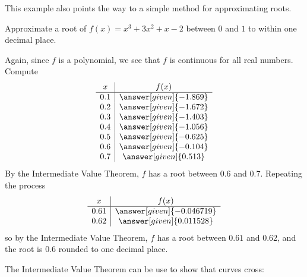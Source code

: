 \documentclass{ximera}
\begin{document}
This example also points the way to a simple method for approximating
roots. 



\begin{example} 
Approximate a root of $f(x) =x^3 + 3x^2+x-2$ between $0$ and $1$ to
within one decimal place.

\begin{explanation} 
Again, since $f$ is a polynomial, we see that $f$ is continuous for
all real numbers. Compute
\[
\begin{array}{c|c}
  x   & f(x) \\ \hline
  0.1 & \answer[given]{-1.869}\\
  0.2 & \answer[given]{-1.672}\\
  0.3 & \answer[given]{-1.403}\\
  0.4 & \answer[given]{-1.056}\\
  0.5 & \answer[given]{-0.625}\\
  0.6 & \answer[given]{-0.104}\\
  0.7 & \answer[given]{0.513}
\end{array}
\]
By the Intermediate Value Theorem, $f$ has a root between $0.6$ and
$0.7$. Repeating the process
\[
\begin{array}{c|c}
  x   & f(x) \\ \hline
  0.61 & \answer[given]{-0.046719}\\
  0.62 & \answer[given]{0.011528}
\end{array}
\]
so by the Intermediate Value Theorem, $f$ has a root between $0.61$
and $0.62$, and the root is $0.6$ rounded to one decimal place.
\end{explanation}
\end{example}


The Intermediate Value Theorem can be use to show that curves cross:
\end{document}
